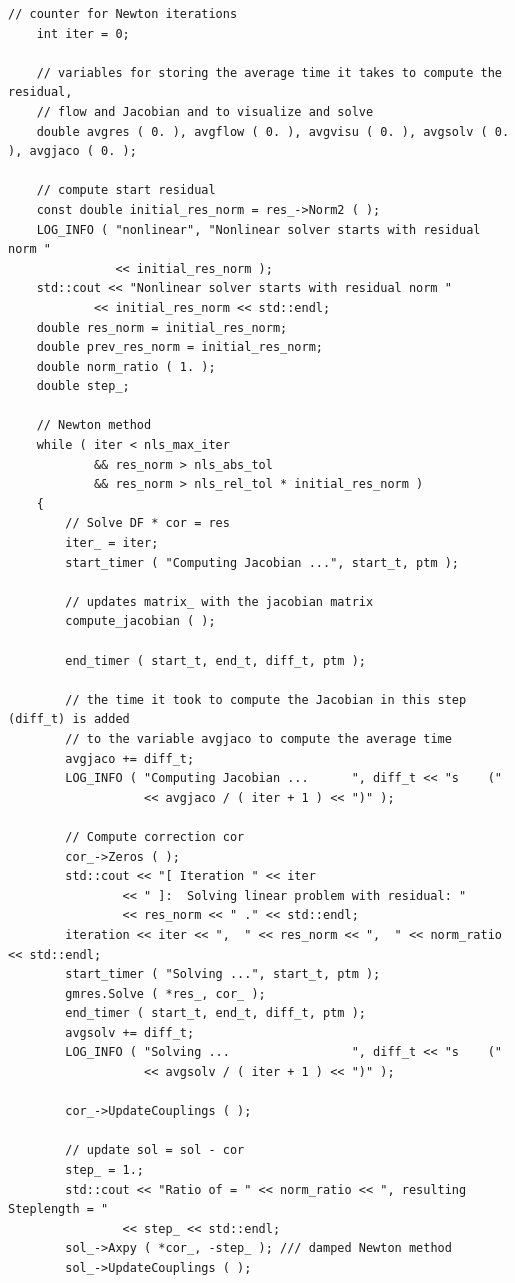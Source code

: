 \documentclass{article}
\begin{document}
\begin{lstlisting}[firstnumber=484]
    // counter for Newton iterations
    int iter = 0;

    // variables for storing the average time it takes to compute the residual,
    // flow and Jacobian and to visualize and solve
    double avgres ( 0. ), avgflow ( 0. ), avgvisu ( 0. ), avgsolv ( 0. ), avgjaco ( 0. );

    // compute start residual
    const double initial_res_norm = res_->Norm2 ( );
    LOG_INFO ( "nonlinear", "Nonlinear solver starts with residual norm "
               << initial_res_norm );
    std::cout << "Nonlinear solver starts with residual norm "
            << initial_res_norm << std::endl;
    double res_norm = initial_res_norm;
    double prev_res_norm = initial_res_norm;
    double norm_ratio ( 1. );
    double step_;

    // Newton method
    while ( iter < nls_max_iter
            && res_norm > nls_abs_tol
            && res_norm > nls_rel_tol * initial_res_norm )
    {
        // Solve DF * cor = res
        iter_ = iter;
        start_timer ( "Computing Jacobian ...", start_t, ptm );

        // updates matrix_ with the jacobian matrix
        compute_jacobian ( );

        end_timer ( start_t, end_t, diff_t, ptm );

        // the time it took to compute the Jacobian in this step (diff_t) is added
        // to the variable avgjaco to compute the average time
        avgjaco += diff_t;
        LOG_INFO ( "Computing Jacobian ...      ", diff_t << "s    ("
                   << avgjaco / ( iter + 1 ) << ")" );

        // Compute correction cor
        cor_->Zeros ( );
        std::cout << "[ Iteration " << iter
                << " ]:  Solving linear problem with residual: "
                << res_norm << " ." << std::endl;
        iteration << iter << ",  " << res_norm << ",  " << norm_ratio << std::endl;
        start_timer ( "Solving ...", start_t, ptm );
        gmres.Solve ( *res_, cor_ );
        end_timer ( start_t, end_t, diff_t, ptm );
        avgsolv += diff_t;
        LOG_INFO ( "Solving ...                 ", diff_t << "s    ("
                   << avgsolv / ( iter + 1 ) << ")" );

        cor_->UpdateCouplings ( );

        // update sol = sol - cor
        step_ = 1.;
        std::cout << "Ratio of = " << norm_ratio << ", resulting Steplength = "
                << step_ << std::endl;
        sol_->Axpy ( *cor_, -step_ ); /// damped Newton method
        sol_->UpdateCouplings ( );


\end{lstlisting}
\end{document}

